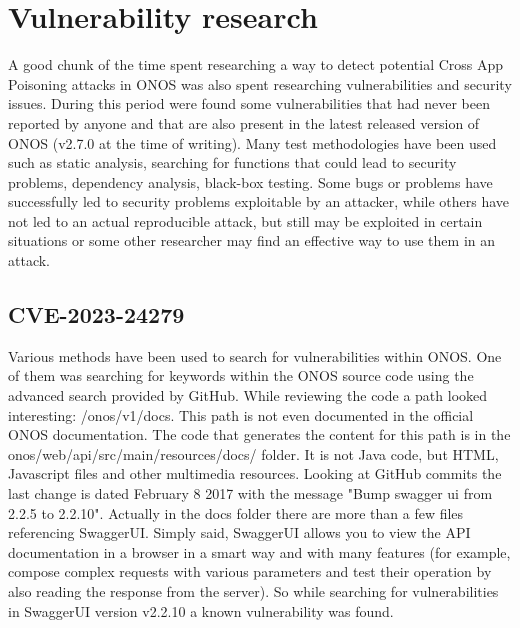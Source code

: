 \clearpage


\section{Vulnerability research}

A good chunk of the time spent researching a way to detect potential Cross App Poisoning attacks in ONOS was also spent researching vulnerabilities and security issues. During this period were found some vulnerabilities that had never been reported by anyone and that are also present in the latest released version of ONOS (v2.7.0 at the time of writing). Many test methodologies have been used such as static analysis, searching for functions that could lead to security problems, dependency analysis, black-box testing. Some bugs or problems have successfully led to security problems exploitable by an attacker, while others have not led to an actual reproducible attack, but still may be exploited in certain situations or some other researcher may find an effective way to use them in an attack.

\subsection{CVE-2023-24279}

Various methods have been used to search for vulnerabilities within ONOS. One of them was searching for keywords within the ONOS source code using the advanced search provided by GitHub. While reviewing the code a path looked interesting: /onos/v1/docs. This path is not even documented in the official ONOS documentation. The code that generates the content for this path is in the onos/web/api/src/main/resources/docs/ folder. It is not Java code, but HTML, Javascript files and other multimedia resources. Looking at GitHub commits the last change is dated February 8 2017 with the message "Bump swagger ui from 2.2.5 to 2.2.10". Actually in the docs folder there are more than a few files referencing SwaggerUI. Simply said, SwaggerUI allows you to view the API documentation in a browser in a smart way and with many features (for example, compose complex requests with various parameters and test their operation by also reading the response from the server). So while searching for vulnerabilities in SwaggerUI version v2.2.10 a known vulnerability was found.

